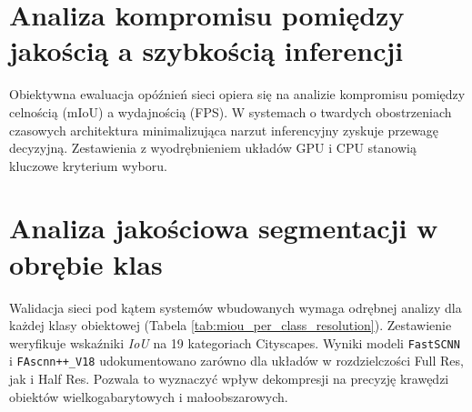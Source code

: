 \section{Analiza kompromisu pomiędzy jakością a szybkością inferencji}
Obiektywna ewaluacja opóźnień sieci opiera się na analizie kompromisu pomiędzy celnością (mIoU) a wydajnością (FPS). W systemach o twardych obostrzeniach czasowych architektura minimalizująca narzut inferencyjny zyskuje przewagę decyzyjną. Zestawienia z wyodrębnieniem układów GPU i CPU stanowią kluczowe kryterium wyboru.

\section{Analiza jakościowa segmentacji w obrębie klas}
Walidacja sieci pod kątem systemów wbudowanych wymaga odrębnej analizy dla każdej klasy obiektowej (Tabela \ref{tab:miou_per_class_resolution}). Zestawienie weryfikuje wskaźniki \textit{IoU} na 19 kategoriach Cityscapes. Wyniki modeli \texttt{FastSCNN} i \texttt{FAscnn++\_V18} udokumentowano zarówno dla układów w rozdzielczości Full Res, jak i Half Res. Pozwala to wyznaczyć wpływ dekompresji na precyzję krawędzi obiektów wielkogabarytowych i małoobszarowych.

